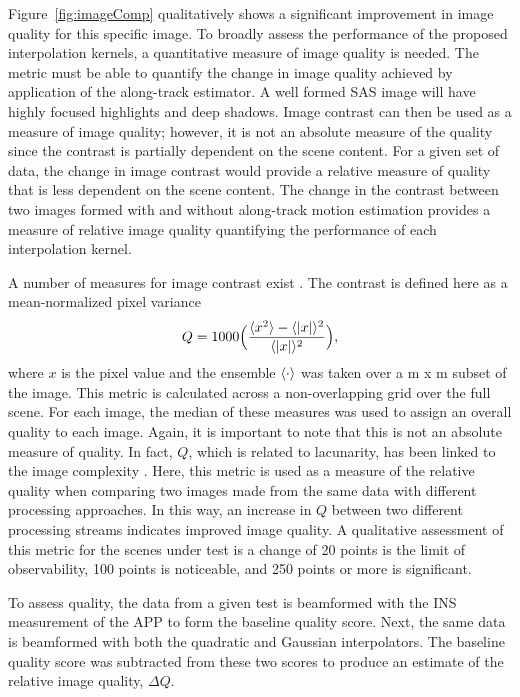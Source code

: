 \documentclass[conference]{IEEEtran}
\begin{document}
Figure~\ref{fig:imageComp} qualitatively shows a significant improvement in image quality for this specific image. To broadly assess the performance of the proposed interpolation kernels, a quantitative measure of image quality is needed. The metric must be able to quantify the change in image quality achieved by application of the along-track estimator. A well formed SAS image will have highly focused highlights and deep shadows. Image contrast can then be used as a measure of image quality; however, it is not an absolute measure of the quality since the contrast is partially dependent on the scene content. For a given set of data, the change in image contrast would provide a relative measure of quality that is less dependent on the scene content. The change in the contrast between two images formed with and without along-track motion estimation provides a measure of relative image quality quantifying the performance of each interpolation kernel.

A number of measures for image contrast exist \cite{Peters:1990a}. The contrast is defined here as a mean-normalized pixel variance
%
\begin{equation} \label{eq:imageQuality}
  Q = 1000\Bigl( \frac{\brkt{x^2}-\brkt{|x|}^2}{\brkt{|x|}^2} \Bigr),
\end{equation}
%
where $x$ is the pixel value and the ensemble $\langle \cdot \rangle$ was taken over a \unit[2]{m} x \unit[2]{m} subset of the image. This metric is calculated across a non-overlapping grid over the full scene. For each image, the median of these measures was used to assign an overall quality to each image. Again, it is important to note that this is not an absolute measure of quality. In fact, $Q$, which is related to lacunarity, has been linked to the image complexity \cite{Williams:2015a}. Here, this metric is used as a measure of the relative quality when comparing two images made from the same data with different processing approaches. In this way, an increase in $Q$ between two different processing streams indicates improved image quality. A qualitative assessment of this metric for the scenes under test is a change of 20 points is the limit of observability, 100 points is noticeable, and 250 points or more is significant.

To assess quality, the data from a given test is beamformed with the INS measurement of the APP to form the baseline quality score. Next, the same data is beamformed with both the quadratic and Gaussian interpolators. The baseline quality score was subtracted from these two scores to produce an estimate of the relative image quality, $\Delta Q$.
\end{document}
